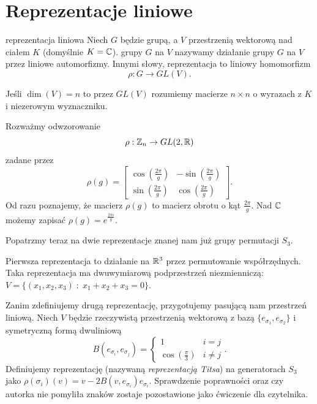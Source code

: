 \section{Reprezentacje liniowe}

\begin{definition}{reprezentacja liniowa}{}
  Niech $G$ będzie grupą, a $V$ przestrzenią wektorową nad ciałem $K$ (domyślnie $K=\mathbb{C}$).  grupy $G$ na $V$ nazywamy działanie grupy $G$ na $V$ przez liniowe automorfizmy. Innymi słowy, reprezentacja to liniowy homomorfizm
  $$\rho:G\to GL(V).$$
\end{definition}

Jeśli $\dim(V)=n$ to przez $GL(V)$ rozumiemy macierze $n\times n$ o wyrazach z $K$ i niezerowym wyznaczniku.

\begin{example}[m]
  \item Rozważmy odwzorowanie 
    $$\rho: \mathbb{Z}_n\to GL(2, \mathbb{R})$$
    zadane przez 
    $$\rho(g)=\begin{bmatrix}\cos(\frac{2\pi}{g})&-\sin(\frac{2\pi}{g})\\ \sin(\frac{2\pi}{g})&\cos(\frac{2\pi}{g})\end{bmatrix}.$$
    Od razu poznajemy, że macierz $\rho(g)$ to macierz obrotu o kąt $\frac{2\pi}{g}$. Nad $\mathbb{C}$ możemy zapisać $\rho(g)=e^{\frac{2\pi i}{g}}$.
  \item Popatrzmy teraz na dwie reprezentacje znanej nam już grupy permutacji $S_3$. 

    Pierwsza reprezentacja to działanie na $\mathbb{R}^3$ przez permutowanie współrzędnych. Taka reprezentacja ma dwuwymiarową podprzestrzeń niezmienniczą: $V=\{(x_1,x_2, x_3)\;:\;x_1+x_2+x_3=0\}$.

    Zanim zdefiniujemy drugą reprezentację, przygotujemy pasującą nam przestrzeń liniową. Niech $V$ będzie rzeczywistą przestrzenią wektorową z bazą $\{e_{\sigma_1}, e_{\sigma_2}\}$ i symetryczną formą dwuliniową
    $$B(e_{\sigma_i}, e_{\sigma_j})=\begin{cases}1 & i=j\\\cos(\frac{\pi}3)&i\neq j\end{cases}.$$
    Definiujemy reprezentację (nazywaną \emph{reprezentacją Titsa}) na generatorach $S_3$ jako $\rho(\sigma_i)(v)=v-2B(v, e_{\sigma_i})e_{\sigma_i}$. Sprawdzenie poprawności oraz czy autorka nie pomyliła znaków zostaje pozostawione jako ćwiczenie dla czytelnika.
\end{example}

